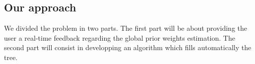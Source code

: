 \subsection{Our approach}
We divided the problem in two parts. The first part will be about providing the user a real-time feedback regarding the global prior weights estimation.
The second part will consist in developping an algorithm which fills automatically the tree.
%
%
%
%
